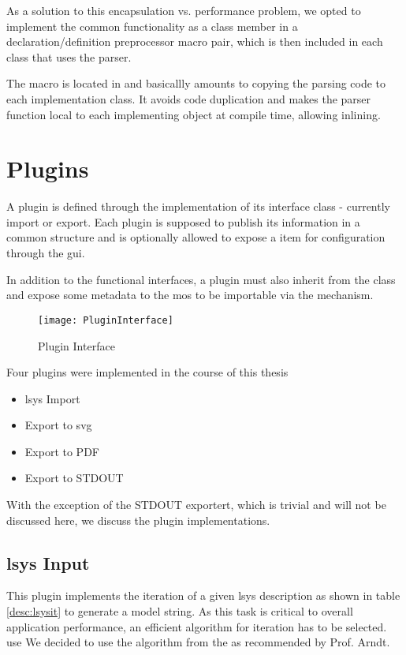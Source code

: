 As a solution to this encapsulation vs. performance problem, we opted to implement the common functionality as a class member in a declaration/definition preprocessor macro pair, which is then included in each class that uses the parser.

The macro is located in  and basicallly amounts to copying the parsing code to each implementation class. It avoids code duplication and makes the parser function local to each implementing object at compile time, allowing inlining.

\section{Plugins}
A plugin is defined through the implementation of its interface class - currently import or export. Each plugin is supposed to publish its information in a common  structure and is optionally allowed to expose a  item for configuration through the \gls{gui}.

In addition to the functional interfaces, a plugin must also inherit from the  class and expose some metadata to the \gls{mos} to be importable via the  mechanism.

\begin{figure}[htb]
	\texttt{[image: PluginInterface]}
	\caption{Plugin Interface}
	\label{fig:plugint}
\end{figure}

Four plugins were implemented in the course of this thesis
\begin{itemize}
	\item \gls{lsys} Import
	\item Export to \gls{svg}
	\item Export to PDF
	\item Export to STDOUT
\end{itemize}

With the exception of the STDOUT exportert, which is trivial and will not be discussed here, we discuss the plugin implementations.

\subsection{\gls{lsys} Input}
\label{sec:lsys}

This plugin implements the iteration of a given \gls{lsys} description as shown in table \ref{desc:lsysit} to generate a model string.
As this task is critical to overall application performance, an efficient algorithm for iteration has to be selected. 
use
We decided to use the  algorithm from the  as recommended by Prof. Arndt.

